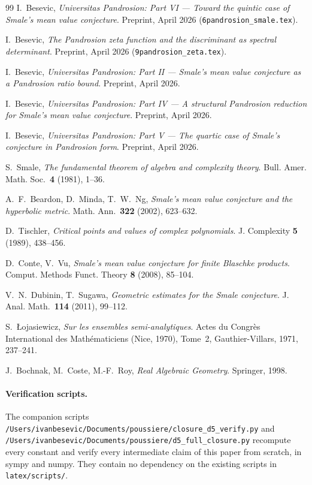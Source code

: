 \documentclass[11pt,a4paper]{article}
\begin{document}
\begin{thebibliography}{99}
 I.~Besevic,
\emph{Universitas Pandrosion: Part VI --- Toward the quintic case of
Smale's mean value conjecture}.
Preprint, April 2026 (\texttt{6pandrosion\_smale.tex}).

 I.~Besevic,
\emph{The Pandrosion zeta function and the discriminant as spectral
determinant}.
Preprint, April 2026 (\texttt{9pandrosion\_zeta.tex}).

 I.~Besevic,
\emph{Universitas Pandrosion: Part II --- Smale's mean value
conjecture as a Pandrosion ratio bound}.
Preprint, April 2026.

 I.~Besevic,
\emph{Universitas Pandrosion: Part IV --- A structural Pandrosion
reduction for Smale's mean value conjecture}.
Preprint, April 2026.

 I.~Besevic,
\emph{Universitas Pandrosion: Part V --- The quartic case of Smale's
conjecture in Pandrosion form}.
Preprint, April 2026.

 S.~Smale,
\emph{The fundamental theorem of algebra and complexity theory}.
Bull. Amer. Math. Soc.\ \textbf{4} (1981), 1--36.

 A.~F.~Beardon, D.~Minda, T.~W.~Ng,
\emph{Smale's mean value conjecture and the hyperbolic metric}.
Math. Ann.\ \textbf{322} (2002), 623--632.

 D.~Tischler,
\emph{Critical points and values of complex polynomials}.
J. Complexity \textbf{5} (1989), 438--456.

 D.~Conte, V.~Vu,
\emph{Smale's mean value conjecture for finite Blaschke products}.
Comput. Methods Funct. Theory \textbf{8} (2008), 85--104.

 V.~N.~Dubinin, T.~Sugawa,
\emph{Geometric estimates for the Smale conjecture}.
J. Anal. Math.\ \textbf{114} (2011), 99--112.

 S.~\L{}ojasiewicz,
\emph{Sur les ensembles semi-analytiques}.
Actes du Congrès International des Mathématiciens (Nice, 1970),
Tome~2, Gauthier-Villars, 1971, 237--241.

 J.~Bochnak, M.~Coste, M.-F.~Roy,
\emph{Real Algebraic Geometry}.
Springer, 1998.
\end{thebibliography}

\paragraph{Verification scripts.}
The companion scripts
\verb|/Users/ivanbesevic/Documents/poussiere/closure_d5_verify.py|
and
\verb|/Users/ivanbesevic/Documents/poussiere/d5_full_closure.py|
recompute every constant and verify every intermediate claim of this
paper from scratch, in sympy and numpy. They contain no dependency on
the existing scripts in \texttt{latex/scripts/}.
\end{document}
